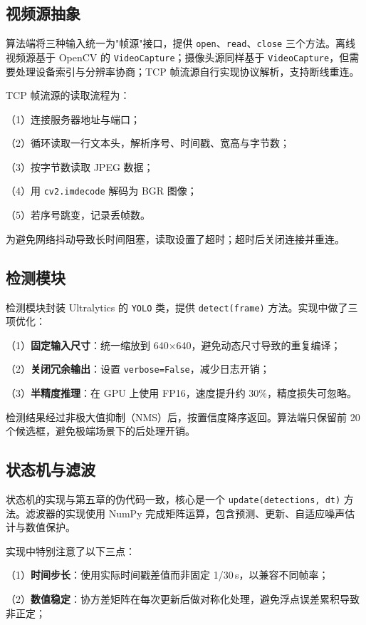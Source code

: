\subsection{视频源抽象}

算法端将三种输入统一为"帧源"接口，提供 \texttt{open}、\texttt{read}、\texttt{close} 三个方法。离线视频源基于 OpenCV 的 \texttt{VideoCapture}；摄像头源同样基于 \texttt{VideoCapture}，但需要处理设备索引与分辨率协商；TCP 帧流源自行实现协议解析，支持断线重连。

TCP 帧流源的读取流程为：

（1）连接服务器地址与端口；

（2）循环读取一行文本头，解析序号、时间戳、宽高与字节数；

（3）按字节数读取 JPEG 数据；

（4）用 \texttt{cv2.imdecode} 解码为 BGR 图像；

（5）若序号跳变，记录丢帧数。

为避免网络抖动导致长时间阻塞，读取设置了超时；超时后关闭连接并重连。

\subsection{检测模块}

检测模块封装 Ultralytics 的 \texttt{YOLO} 类，提供 \texttt{detect(frame)} 方法。实现中做了三项优化：

（1）\textbf{固定输入尺寸}：统一缩放到 640$\times$640，避免动态尺寸导致的重复编译；

（2）\textbf{关闭冗余输出}：设置 \texttt{verbose=False}，减少日志开销；

（3）\textbf{半精度推理}：在 GPU 上使用 FP16，速度提升约 30\%，精度损失可忽略。

检测结果经过非极大值抑制（NMS）后，按置信度降序返回。算法端只保留前 20 个候选框，避免极端场景下的后处理开销。

\subsection{状态机与滤波}

状态机的实现与第五章的伪代码一致，核心是一个 \texttt{update(detections, dt)} 方法。滤波器的实现使用 NumPy 完成矩阵运算，包含预测、更新、自适应噪声估计与数值保护。

实现中特别注意了以下三点：

（1）\textbf{时间步长}：使用实际时间戳差值而非固定 1/30\,s，以兼容不同帧率；

（2）\textbf{数值稳定}：协方差矩阵在每次更新后做对称化处理，避免浮点误差累积导致非正定；

